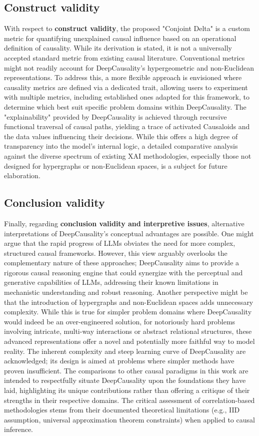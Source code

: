 \subsection{Construct validity}

With respect to \textbf{construct validity}, the proposed "Conjoint Delta" is a custom metric for quantifying unexplained causal influence based on an operational definition of causality. While its derivation is stated, it is not a universally accepted standard metric from existing causal literature. Conventional metrics might not readily account for DeepCausality's hypergeometric and non-Euclidean representations. To address this, a more flexible approach is envisioned where causality metrics are defined via a dedicated trait, allowing users to experiment with multiple metrics, including established ones adapted for this framework, to determine which best suit specific problem domains within DeepCausality. The "explainability" provided by DeepCausality is achieved through recursive functional traversal of causal paths, yielding a trace of activated Causaloids and the data values influencing their decisions. While this offers a high degree of transparency into the model's internal logic, a detailed comparative analysis against the diverse spectrum of existing XAI methodologies, especially those not designed for hypergraphs or non-Euclidean spaces, is a subject for future elaboration.

\subsection{Conclusion validity}

Finally, regarding \textbf{conclusion validity and interpretive issues}, alternative interpretations of DeepCausality's conceptual advantages are possible. One might argue that the rapid progress of LLMs obviates the need for more complex, structured causal frameworks. However, this view arguably overlooks the complementary nature of these approaches; DeepCausality aims to provide a rigorous causal reasoning engine that could synergize with the perceptual and generative capabilities of LLMs, addressing their known limitations in mechanistic understanding and robust reasoning. Another perspective might be that the introduction of hypergraphs and non-Euclidean spaces adds unnecessary complexity. While this is true for simpler problem domains where DeepCausality would indeed be an over-engineered solution, for notoriously hard problems involving intricate, multi-way interactions or abstract relational structures, these advanced representations offer a novel and potentially more faithful way to model reality. The inherent complexity and steep learning curve of DeepCausality are acknowledged; its design is aimed at problems where simpler methods have proven insufficient. The comparisons to other causal paradigms in this work are intended to respectfully situate DeepCausality upon the foundations they have laid, highlighting its unique contributions rather than offering a critique of their strengths in their respective domains. The critical assessment of correlation-based methodologies stems from their documented theoretical limitations (e.g., IID assumption, universal approximation theorem constraints) when applied to causal inference.